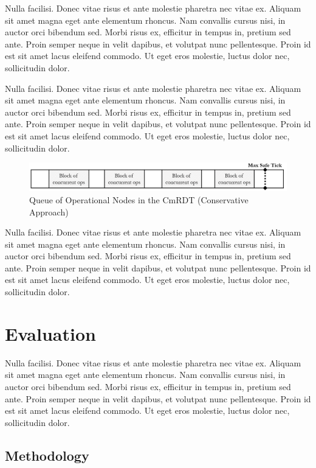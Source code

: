 \documentclass[sigconf,nonacm]{acmart}
\begin{document}
Nulla facilisi. Donec vitae risus et ante molestie pharetra nec vitae ex. Aliquam sit amet magna eget ante elementum rhoncus. Nam convallis cursus nisi, in auctor orci bibendum sed. Morbi risus ex, efficitur in tempus in, pretium sed ante. Proin semper neque in velit dapibus, et volutpat nunc pellentesque. Proin id est sit amet lacus eleifend commodo. Ut eget eros molestie, luctus dolor nec, sollicitudin dolor.

Nulla facilisi. Donec vitae risus et ante molestie pharetra nec vitae ex. Aliquam sit amet magna eget ante elementum rhoncus. Nam convallis cursus nisi, in auctor orci bibendum sed. Morbi risus ex, efficitur in tempus in, pretium sed ante. Proin semper neque in velit dapibus, et volutpat nunc pellentesque. Proin id est sit amet lacus eleifend commodo. Ut eget eros molestie, luctus dolor nec, sollicitudin dolor.

\begin{figure}[h]
  \centering
  \includegraphics[width=15.5cm]{Fig6CmRDTQ2}
  \caption{Queue of Operational Nodes in the CmRDT (Conservative Approach)}
  \label{fig:cmrdtq2}
\end{figure}

Nulla facilisi. Donec vitae risus et ante molestie pharetra nec vitae ex. Aliquam sit amet magna eget ante elementum rhoncus. Nam convallis cursus nisi, in auctor orci bibendum sed. Morbi risus ex, efficitur in tempus in, pretium sed ante. Proin semper neque in velit dapibus, et volutpat nunc pellentesque. Proin id est sit amet lacus eleifend commodo. Ut eget eros molestie, luctus dolor nec, sollicitudin dolor.

\section{Evaluation}

Nulla facilisi. Donec vitae risus et ante molestie pharetra nec vitae ex. Aliquam sit amet magna eget ante elementum rhoncus. Nam convallis cursus nisi, in auctor orci bibendum sed. Morbi risus ex, efficitur in tempus in, pretium sed ante. Proin semper neque in velit dapibus, et volutpat nunc pellentesque. Proin id est sit amet lacus eleifend commodo. Ut eget eros molestie, luctus dolor nec, sollicitudin dolor.

\subsection{Methodology}
\end{document}
